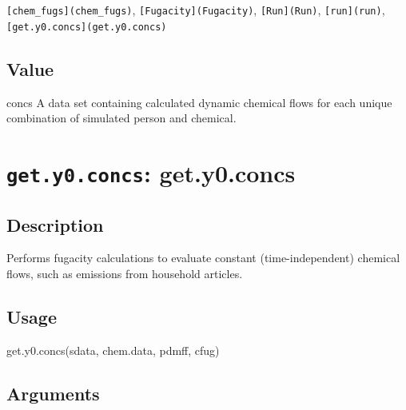 \documentclass[
]{article}
\newenvironment{Shaded}{\begin{snugshade}}{\end{snugshade}}
\newcommand{\FunctionTok}[1]{\textcolor[rgb]{0.00,0.00,0.00}{#1}}
\newcommand{\NormalTok}[1]{#1}
\begin{document}
\texttt{{[}chem\_fugs{]}(chem\_fugs)},
\texttt{{[}Fugacity{]}(Fugacity)}, \texttt{{[}Run{]}(Run)},
\texttt{{[}run{]}(run)}, \texttt{{[}get.y0.concs{]}(get.y0.concs)}

\hypertarget{value-20}{%
\subsection{Value}\label{value-20}}

concs A data set containing calculated dynamic chemical flows for each
unique combination of simulated person and chemical.

\hypertarget{get.y0.concs-get.y0.concs}{%
\section{\texorpdfstring{\texttt{get.y0.concs}:
get.y0.concs}{get.y0.concs: get.y0.concs}}\label{get.y0.concs-get.y0.concs}}

\hypertarget{description-26}{%
\subsection{Description}\label{description-26}}

Performs fugacity calculations to evaluate constant (time-independent)
chemical flows, such as emissions from household articles.

\hypertarget{usage-26}{%
\subsection{Usage}\label{usage-26}}

\begin{Shaded}
\begin{Highlighting}[]
\FunctionTok{get.y0.concs}\NormalTok{(sdata, chem.data, pdmff, cfug)}
\end{Highlighting}
\end{Shaded}

\hypertarget{arguments-23}{%
\subsection{Arguments}\label{arguments-23}}
\end{document}
